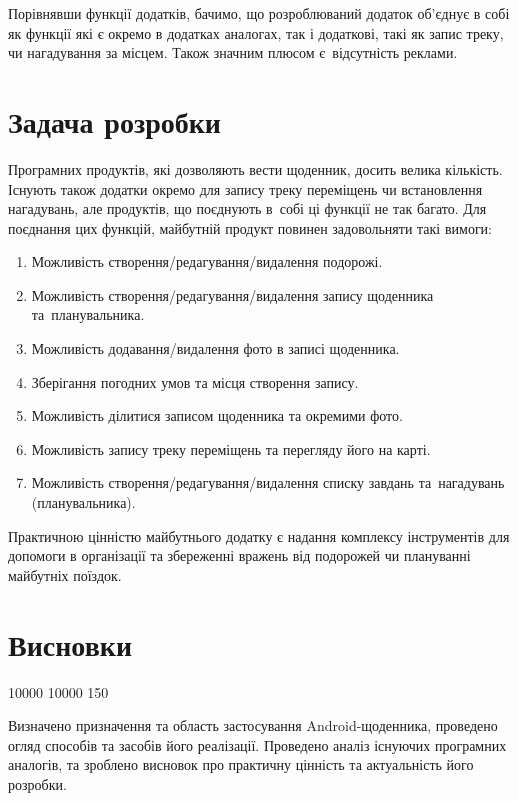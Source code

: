 \documentclass[../main.tex]{subfiles}
\begin{document}
{Порівнявши функції додатків, бачимо, що розроблюваний додаток об'єднує в собі як функції які є окремо в додатках аналогах, так і додаткові, такі як запис треку, чи нагадування за місцем. Також значним плюсом є~відсутність реклами.

}

\section{Задача розробки}

Програмних продуктів, які дозволяють вести щоденник, досить велика кількість. Існують також додатки окремо для запису треку переміщень чи встановлення нагадувань, але продуктів, що поєднують в~собі ці функції не так багато. Для поєднання цих функцій, майбутній продукт повинен задовольняти такі вимоги: 

\begin{enumerate}
	\item Можливість створення/редагування/видалення подорожі.
	\item Можливість створення/редагування/видалення запису щоденника та~планувальника.
	\item Можливість додавання/видалення фото в записі щоденника.
	\item Зберігання погодних умов та місця створення запису.
	\item Можливість ділитися записом щоденника та окремими фото.
	\item Можливість запису треку переміщень та перегляду його на карті.
	\item Можливість створення/редагування/видалення списку завдань та~нагадувань (планувальника).
\end{enumerate}

Практичною цінністю майбутнього додатку є надання комплексу інструментів для допомоги в організації та збереженні вражень від подорожей чи плануванні майбутніх поїздок.

\section{Висновки}

{
 10000 10000 150  %

Визначено призначення та область застосування Android-щоденника, проведено огляд способів та засобів його реалізації. Проведено аналіз існуючих програмних аналогів, та зроблено висновок про практичну цінність та актуальність його розробки.

}
\end{document}
